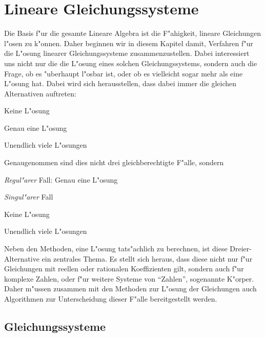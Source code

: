 %
%
%
\chapter{Lineare Gleichungssysteme\label{chapter-lingl}}
Die Basis f"ur die gesamte Lineare Algebra ist die F"ahigkeit, lineare
Gleichungen l"osen zu k"onnen. Daher beginnen wir in diesem Kapitel
damit, Verfahren f"ur die L"osung linearer Gleichungssysteme
zusammenzustellen. Dabei interessiert uns nicht nur die die L"osung
eines solchen Gleichungssystems, sondern auch die Frage, ob es
"uberhaupt l"osbar ist, oder ob es vielleicht sogar mehr als eine
L"osung hat. Dabei wird sich herausstellen, dass dabei immer die
gleichen Alternativen auftreten:
\begin{compactenum}
\item Keine L"osung
\item Genau eine L"osung
\item Unendlich viele L"osungen
\end{compactenum}
Genaugenommen sind dies nicht drei gleichberechtigte F"alle,
sondern
\begin{compactenum}
\item {\em Regul"arer} Fall: Genau eine L"osung
\item {\em Singul"arer} Fall
\begin{compactenum}
\item Keine L"osung
\item Unendlich viele L"osungen
\end{compactenum}
\end{compactenum}
Neben den Methoden, eine L"osung tats"achlich zu berechnen, ist
diese Dreier-Alternative ein zentrales Thema. Es stellt sich heraus,
dass diese nicht nur f"ur Gleichungen mit reellen oder rationalen
Koeffizienten gilt, sondern auch f"ur komplexe Zahlen, oder
f"ur weitere Systeme von ``Zahlen'', sogenannte K"orper. Daher
m"ussen zusammen mit den Methoden zur L"osung der Gleichungen
auch Algorithmen zur Unterscheidung dieser F"alle bereitgestellt
werden.

\section{Gleichungssysteme}
